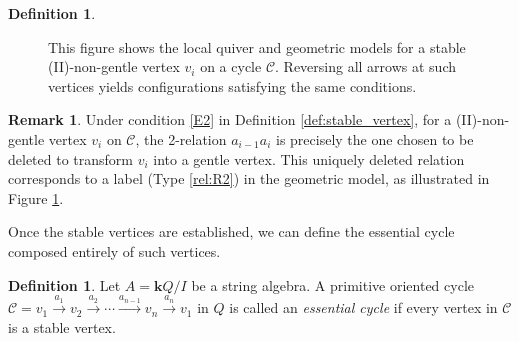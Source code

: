 \documentclass[11pt]{amsart}
\numberwithin{equation}{section}
\theoremstyle{definition}
\newtheorem{remark}[theorem]{Remark}
\newtheorem{definition}[theorem]{Definition}
\begin{document}
\begin{definition}
\begin{figure}[htbp]

\caption{This figure shows the local quiver and geometric models for a stable (II)-non-gentle vertex $v_i$ on a cycle $\mathcal{C}$. Reversing all arrows at such vertices yields configurations satisfying the same conditions.}
\label{fig:red puncture}
\end{figure}
\end{definition}


\begin{remark}
Under condition \ref{E2} in Definition \ref{def:stable_vertex}, for a (II)-non-gentle vertex $v_i$ on $\mathcal{C}$, the 2-relation $a_{i-1}a_i$ is precisely the one chosen to be deleted to transform $v_i$ into a gentle vertex. This uniquely deleted relation corresponds to a label (Type \ref{rel:R2}) in the geometric model, as illustrated in Figure \ref{fig:red puncture}.
\end{remark}

Once the stable vertices are established, we can define the essential cycle  composed entirely of such vertices.

\begin{definition} \label{def:essential_cycle}
Let $A=\mathbf{k}Q/I$ be a string algebra. A primitive oriented cycle  $\mathcal{C} = v_1 \xrightarrow{a_1} v_2 \xrightarrow{a_2} \cdots \xrightarrow{a_{n-1}} v_n \xrightarrow{a_n} v_1$  in $Q$ is called an \emph{essential cycle} if every vertex in \(\mathcal{C}\) is a stable vertex. 
\end{definition}
\end{document}
